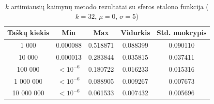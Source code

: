 \begin{table}[H]
    \centering
    \begin{tabular}{|c|c|c|c|c|}
        \hline
        \textbf{Taškų kiekis} & \textbf{Min} & \textbf{Max} & \textbf{Vidurkis} & \textbf{Std. nuokrypis} \\ \hline
        1 000        & 0.000088 & 0.518871 & 0.088399 & 0.090110 \\ \hline
        10 000       & 0.000013 & 0.283844 & 0.035815 & 0.037411 \\ \hline
        100 000      & $<10^{-6}$ & 0.180722 & 0.016233 & 0.015316 \\ \hline
        1 000 000    & $<10^{-6}$ & 0.088905 & 0.009267 & 0.007673 \\ \hline
        10 000 000   & $<10^{-6}$ & 0.061533 & 0.007432 & 0.005696 \\ \hline
    \end{tabular}
    \caption{$k$ artimiausių kaimynų metodo rezultatai su sferos etalono funkcija ($k = 32$, $\mu = 0$, $\sigma = 5$)}
\end{table}